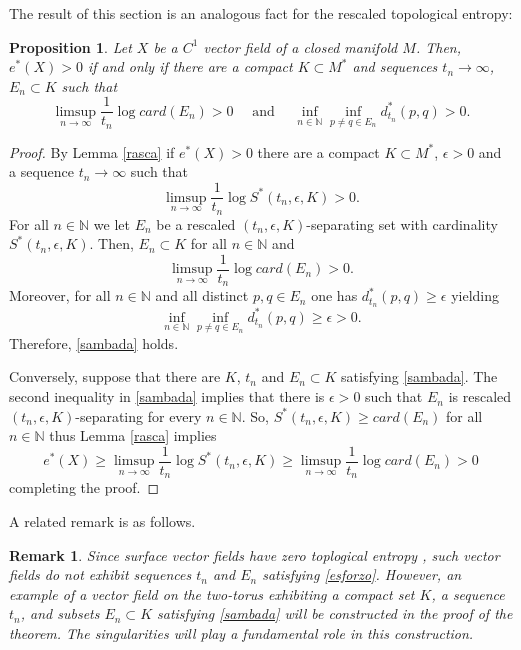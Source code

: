 \documentclass{amsart}
\newtheorem{prop}{Proposition}
\newtheorem{remark}{Remark}
\numberwithin{equation}{section}
\begin{document}
The result of this section is an analogous fact for the rescaled topological entropy:


\begin{prop}
\label{naro}
Let $X$ be a $C^1$ vector field of a closed manifold $M$.
Then, $e^*(X)>0$ if and only if
there are a compact $K\subset M^*$ and sequences $t_n\to\infty$, $E_n\subset K$ such that
\begin{equation}
\label{sambada}
\limsup_{n\to\infty}\frac{1}{t_n}\log card(E_n)>0\quad\mbox{ and }
\quad
\inf_{n\in\mathbb{N}}\inf_{p\neq q\in E_n}d^*_{t_n}(p,q)>0.
\end{equation}
\end{prop}

\begin{proof}
By Lemma \ref{rasca} if $e^*(X)>0$  there are a compact $K\subset M^*$, $\epsilon>0$ and a sequence $t_n\to\infty$ such that
$$
\limsup_{n\to\infty}\frac{1}{t_n}\log S^*(t_n,\epsilon,K)>0.
$$
For all $n\in\mathbb{N}$ we let $E_n$ be a rescaled $(t_n,\epsilon,K)$-separating set with cardinality $S^*(t_n,\epsilon,K)$. Then, $E_n\subset K$ for all $n\in\mathbb{N}$ and
$$
\limsup_{n\to\infty}\frac{1}{t_n}\log card(E_n)>0.
$$
Moreover,
for all $n\in\mathbb{N}$ and all distinct $p,q\in E_n$ one has $d^*_{t_n}(p,q)\geq \epsilon$ yielding
$$
\inf_{n\in\mathbb{N}}\inf_{p\neq q\in E_n}d^*_{t_n}(p,q)\geq\epsilon>0.
$$
Therefore, \eqref{sambada} holds.

Conversely, suppose that there are $K$, $t_n$ and $E_n\subset K$ satisfying \eqref{sambada}.
The second inequality in \eqref{sambada} implies that there is $\epsilon>0$ such that $E_n$ is rescaled $(t_n,\epsilon,K)$-separating for every $n\in\mathbb{N}$.
So, $S^*(t_n,\epsilon,K)\geq card(E_n)$ for all $n\in\mathbb{N}$ thus Lemma \ref{rasca} implies
$$
e^*(X)\geq \limsup_{n\to\infty}\frac{1}{t_n}\log S^*(t_n,\epsilon,K)\geq \limsup_{n\to\infty}\frac{1}{t_n}\log card(E_n)>0
$$
completing the proof.
\end{proof}

A related remark is as follows.

\begin{remark}
\label{ba}
Since surface vector fields have zero toplogical entropy \cite{lg}, such vector fields do not exhibit sequences \( t_n \) and \( E_n \) satisfying \eqref{esforzo}.
However, an example of a vector field on the two-torus exhibiting a compact set \( K \), a sequence \( t_n \), and subsets \( E_n \subset K \) satisfying \eqref{sambada} will be constructed in the proof of the theorem. The singularities will play a fundamental role
in this construction.
\end{remark}
\end{document}
